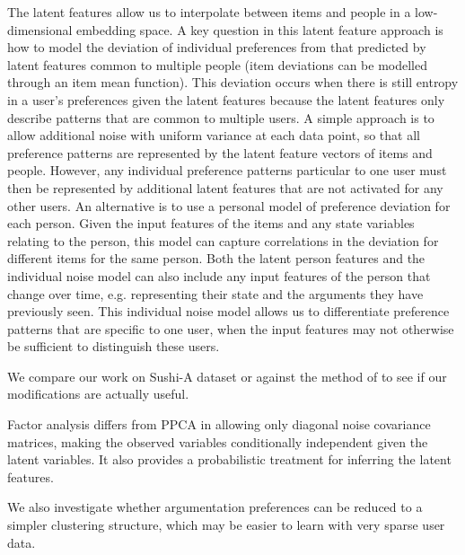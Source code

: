 
The latent features allow us to interpolate between items and people in a low-dimensional embedding space. 
A key question in this latent feature approach is how to model the deviation of individual 
preferences from that predicted by latent features common to multiple people (item deviations
can be modelled through an item mean function).
This deviation occurs when there is still entropy in a user's preferences given the latent features
because the latent features only describe patterns that are common to multiple users.
A simple approach is to allow additional noise with uniform variance at each data point, 
so that all preference patterns are represented by the latent feature vectors of items and people.
However, any individual preference patterns particular to one user must then be represented by additional
latent features that are not activated for any other users. 
An alternative is to use a personal model of preference deviation for each person. 
Given the input features of the items and any state variables relating to the person, 
this model can capture correlations in the deviation for different items for the same person. 
Both the latent person features and the individual noise model can also include any input features of 
the person that change over time, e.g. representing their state and the arguments they have 
previously seen. 
This individual noise model allows us to differentiate preference patterns that are specific to 
one user, when the input features may not otherwise be sufficient to distinguish these users. 


We compare our work on Sushi-A dataset or against the method of \cite{khan2014scalable} to see if 
our modifications are actually useful. 

Factor analysis differs from PPCA in allowing only diagonal noise covariance matrices, making 
the observed variables conditionally independent given the latent variables. It also provides
a probabilistic treatment for inferring the latent features. %

We also investigate whether argumentation preferences can be reduced to a simpler
clustering structure, which may be easier to learn with very sparse user data.

